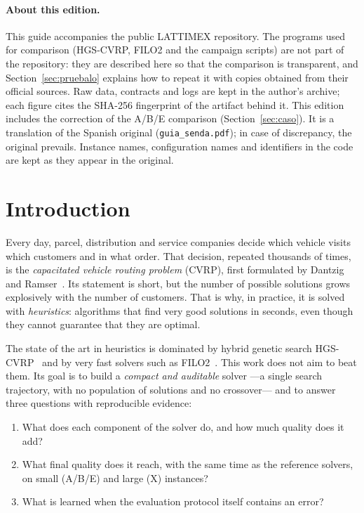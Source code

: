 \documentclass[11pt,a4paper]{article}
\newcommand{\tsl}[1]{\texttt{\small #1}}
\begin{document}
\paragraph{About this edition.} This guide accompanies the public LATTIMEX repository. The programs
used for comparison (HGS-CVRP, FILO2 and the campaign scripts) are not part of the repository: they
are described here so that the comparison is transparent, and Section~\ref{sec:pruebalo} explains
how to repeat it with copies obtained from their official sources. Raw data, contracts and logs are
kept in the author's archive; each figure cites the SHA-256 fingerprint of the artifact behind it.
This edition includes the correction of the A/B/E comparison (Section~\ref{sec:caso}). It is a
translation of the Spanish original (\tsl{guia\_senda.pdf}); in case of discrepancy, the original
prevails. Instance names, configuration names and identifiers in the code are kept as they appear
in the original.

\section{Introduction}
\label{sec:intro}

Every day, parcel, distribution and service companies decide which vehicle visits which customers
and in what order. That decision, repeated thousands of times, is the \emph{capacitated vehicle
routing problem} (CVRP), first formulated by Dantzig and Ramser~\cite{dantzig1959}. Its statement is
short, but the number of possible solutions grows explosively with the number of customers. That is
why, in practice, it is solved with \emph{heuristics}: algorithms that find very good solutions in
seconds, even though they cannot guarantee that they are optimal.

The state of the art in heuristics is dominated by hybrid genetic search
HGS-CVRP~\cite{vidal2012,vidal2022hgs} and by very fast solvers such as FILO2~\cite{accorsi2023}.
This work does not aim to beat them. Its goal is to build a \emph{compact and auditable} solver ---a
single search trajectory, with no population of solutions and no crossover--- and to answer three
questions with reproducible evidence:

\begin{enumerate}[label=\textbf{Q\arabic*.}]
\item What does each component of the solver do, and how much quality does it add?
\item What final quality does it reach, with the same time as the reference solvers, on small (A/B/E)
and large (X) instances?
\item What is learned when the evaluation protocol itself contains an error?
\end{enumerate}
\end{document}
